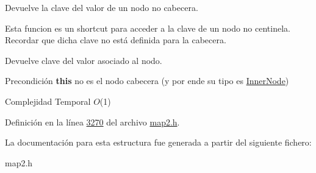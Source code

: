 \-Devuelve la clave del valor de un nodo no cabecera. 

\-Esta funcion es un shortcut para acceder a la clave de un nodo no centinela. \-Recordar que dicha clave no está definida para la cabecera.

\begin{DoxyReturn}{\-Devuelve}
clave del valor asociado al nodo.
\end{DoxyReturn}
\begin{DoxyPrecond}{\-Precondición}
{\bfseries this} no es el nodo cabecera (y por ende su tipo es \hyperlink{structaed2_1_1iterator_1_1InnerNode}{\-Inner\-Node})
\end{DoxyPrecond}

\begin{DoxyDescription}
\item[\-Complejidad \-Temporal]$O$(1)
\end{DoxyDescription}

\-Definición en la línea \hyperlink{map2_8h_source_l03270}{3270} del archivo \hyperlink{map2_8h_source}{map2.\-h}.



\-La documentación para esta estructura fue generada a partir del siguiente fichero\-:\begin{DoxyCompactItemize}
\item 
map2.\-h\end{DoxyCompactItemize}
